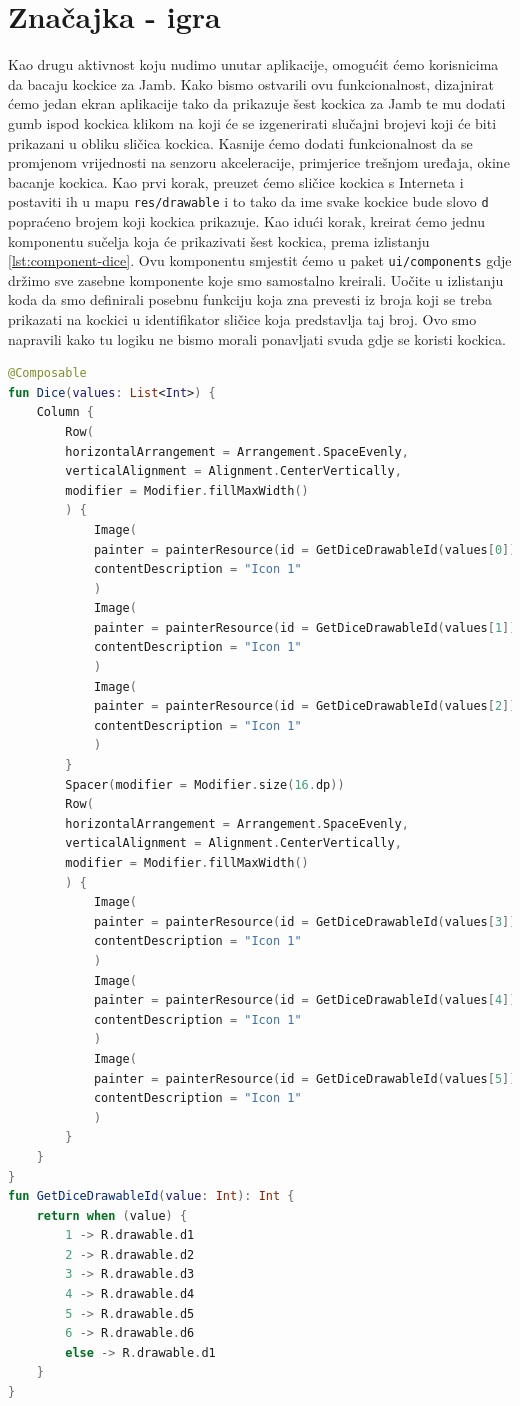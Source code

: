 \documentclass[11pt,a4paper,twoside]{article}
\begin{document}
\section{Značajka - igra}

Kao drugu aktivnost koju nudimo unutar aplikacije, omogućit ćemo korisnicima da bacaju kockice za Jamb. Kako bismo ostvarili ovu funkcionalnost, dizajnirat ćemo jedan ekran aplikacije tako da prikazuje šest kockica za Jamb te mu dodati gumb ispod kockica klikom na koji će se izgenerirati slučajni brojevi koji će biti prikazani u obliku sličica kockica. Kasnije ćemo dodati funkcionalnost da se promjenom vrijednosti na senzoru akceleracije, primjerice trešnjom uređaja, okine bacanje kockica. Kao prvi korak, preuzet ćemo sličice kockica s Interneta i postaviti ih u mapu \texttt{res/drawable} i to tako da ime svake kockice bude slovo \texttt{d} popraćeno brojem koji kockica prikazuje. Kao idući korak, kreirat ćemo jednu komponentu sučelja koja će prikazivati šest kockica, prema izlistanju \ref{lst:component-dice}. Ovu komponentu smjestit ćemo u paket \texttt{ui/components} gdje držimo sve zasebne komponente koje smo samostalno kreirali. Uočite u izlistanju koda da smo definirali posebnu funkciju koja zna prevesti iz broja koji se treba prikazati na kockici u identifikator sličice koja predstavlja taj broj. Ovo smo napravili kako tu logiku ne bismo morali ponavljati svuda gdje se koristi kockica.

\begin{lstlisting}[caption={Komponenta kockice - Dice.kt}, label={lst:component-dice}, language=Kotlin]
@Composable
fun Dice(values: List<Int>) {
	Column {
		Row(
		horizontalArrangement = Arrangement.SpaceEvenly,
		verticalAlignment = Alignment.CenterVertically,
		modifier = Modifier.fillMaxWidth()
		) {
			Image(
			painter = painterResource(id = GetDiceDrawableId(values[0])),
			contentDescription = "Icon 1"
			)
			Image(
			painter = painterResource(id = GetDiceDrawableId(values[1])),
			contentDescription = "Icon 1"
			)
			Image(
			painter = painterResource(id = GetDiceDrawableId(values[2])),
			contentDescription = "Icon 1"
			)
		}
		Spacer(modifier = Modifier.size(16.dp))
		Row(
		horizontalArrangement = Arrangement.SpaceEvenly,
		verticalAlignment = Alignment.CenterVertically,
		modifier = Modifier.fillMaxWidth()
		) {
			Image(
			painter = painterResource(id = GetDiceDrawableId(values[3])),
			contentDescription = "Icon 1"
			)
			Image(
			painter = painterResource(id = GetDiceDrawableId(values[4])),
			contentDescription = "Icon 1"
			)
			Image(
			painter = painterResource(id = GetDiceDrawableId(values[5])),
			contentDescription = "Icon 1"
			)
		}
	}
}
fun GetDiceDrawableId(value: Int): Int {
	return when (value) {
		1 -> R.drawable.d1
		2 -> R.drawable.d2
		3 -> R.drawable.d3
		4 -> R.drawable.d4
		5 -> R.drawable.d5
		6 -> R.drawable.d6
		else -> R.drawable.d1
	}
}
\end{lstlisting}
\end{document}
